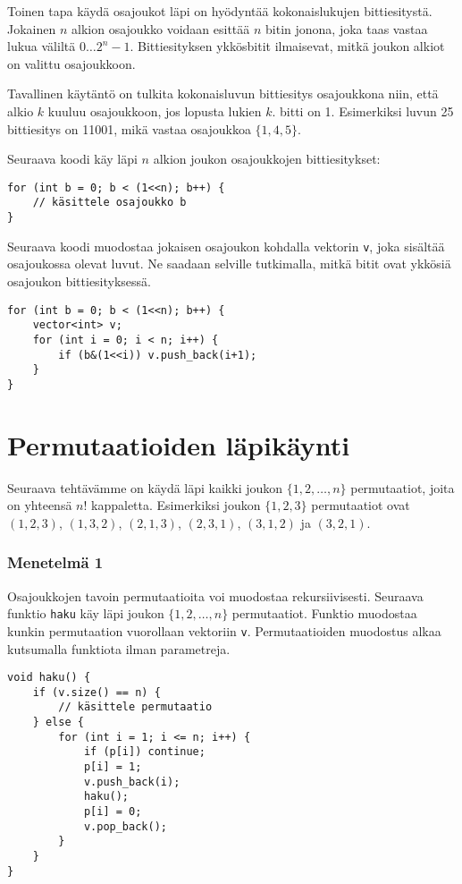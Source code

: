 Toinen tapa käydä osajoukot läpi on hyödyntää kokonaislukujen
bittiesitystä. Jokainen $n$ alkion osajoukko
voidaan esittää $n$ bitin jonona,
joka taas vastaa lukua väliltä $0 \ldots 2^n-1$.
Bittiesityksen ykkösbitit ilmaisevat,
mitkä joukon alkiot on valittu osajoukkoon.

Tavallinen käytäntö on tulkita kokonaisluvun
bittiesitys osajoukkona niin,
että alkio $k$ kuuluu osajoukkoon,
jos lopusta lukien $k$. bitti on 1.
Esimerkiksi luvun 25 bittiesitys on 11001,
mikä vastaa osajoukkoa $\{1,4,5\}$.

Seuraava koodi käy läpi $n$ alkion joukon
osajoukkojen bittiesitykset:

\begin{lstlisting}
for (int b = 0; b < (1<<n); b++) {
    // käsittele osajoukko b
}
\end{lstlisting}

Seuraava koodi muodostaa jokaisen osajoukon
kohdalla vektorin \texttt{v},
joka sisältää osajoukossa olevat luvut.
Ne saadaan selville tutkimalla, mitkä bitit ovat
ykkösiä osajoukon bittiesityksessä.

\begin{lstlisting}
for (int b = 0; b < (1<<n); b++) {
    vector<int> v;
    for (int i = 0; i < n; i++) {
        if (b&(1<<i)) v.push_back(i+1);
    }
}
\end{lstlisting}

\section{Permutaatioiden läpikäynti}


Seuraava tehtävämme on käydä läpi
kaikki joukon $\{1,2,\ldots,n\}$ permutaatiot,
joita on yhteensä $n!$ kappaletta.
Esimerkiksi joukon $\{1,2,3\}$
permutaatiot ovat $(1,2,3)$, $(1,3,2)$,
$(2,1,3)$, $(2,3,1)$, $(3,1,2)$ ja $(3,2,1)$.

\subsubsection{Menetelmä 1}

Osajoukkojen tavoin permutaatioita voi muodostaa
rekursiivisesti.
Seuraava funktio \texttt{haku} käy läpi
joukon $\{1,2,\ldots,n\}$ permutaatiot.
Funktio muodostaa kunkin permutaation
vuorollaan vektoriin \texttt{v}.
Permutaatioiden muodostus alkaa kutsumalla
funktiota ilman parametreja.

\begin{lstlisting}
void haku() {
    if (v.size() == n) {
        // käsittele permutaatio
    } else {
        for (int i = 1; i <= n; i++) {
            if (p[i]) continue;
            p[i] = 1;
            v.push_back(i);
            haku();
            p[i] = 0;
            v.pop_back();
        }
    }
}
\end{lstlisting}

